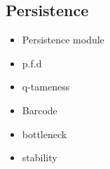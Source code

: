 
\subsection{Persistence}

\begin{itemize}
	\item Persistence module
	\item p.f.d
	\item q-tameness
	\item Barcode
	\item bottleneck
	\item stability
\end{itemize}